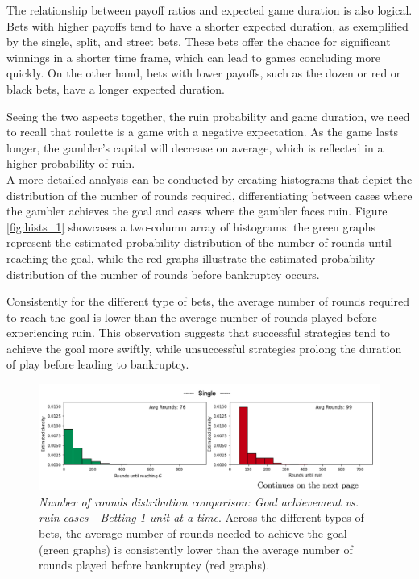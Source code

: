 \documentclass[11pt,twoside]{article}
\numberwithin{Theorem}{section}
\numberwithin{Definition}{section}
\numberwithin{Lemma}{section}
\numberwithin{Algorithm}{section}
\numberwithin{equation}{section}
\begin{document}
The relationship between payoff ratios and expected game duration is also logical. Bets with higher payoffs tend to have a shorter expected duration, as exemplified by the single, split, and street bets. These bets offer the chance for significant winnings in a shorter time frame, which can lead to games concluding more quickly. On the other hand, bets with lower payoffs, such as the dozen or red or black bets, have a longer expected duration.

Seeing the two aspects together, the ruin probability and game duration, we need to recall that roulette is a game with a negative expectation. As the game lasts longer, the gambler's capital will decrease on average, which is reflected in a higher probability of ruin.\\

A more detailed analysis can be conducted by creating histograms that depict the distribution of the number of rounds required, differentiating between cases where the gambler achieves the goal and cases where the gambler faces ruin. Figure \ref{fig:hists_1} showcases a two-column array of histograms: the green graphs represent the estimated probability distribution of the number of rounds until reaching the goal, while the red graphs illustrate the estimated probability distribution of the number of rounds before bankruptcy occurs.

Consistently for the different type of bets, the average number of rounds required to reach the goal is lower than the average number of rounds played before experiencing ruin. This observation suggests that successful strategies tend to achieve the goal more swiftly, while unsuccessful strategies prolong the duration of play before leading to bankruptcy.
\begin{figure}[H]
        \centering
        \includegraphics[width=13cm]{cut_1.png}
        \caption* {\textit{Number of rounds distribution comparison: Goal achievement vs. ruin cases - Betting 1 unit at a time}. Across the different types of bets, the average number of rounds needed to achieve the goal (green graphs) is consistently lower than the average number of rounds played before bankruptcy (red graphs).} 
\end{figure}
\end{document}
